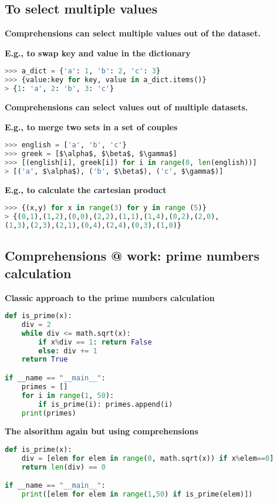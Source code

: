 \subsection{To select multiple values}
\textbf{Comprehensions can select multiple values out of the dataset.}

\textbf{E.g., to swap key and value in the dictionary}
\begin{lstlisting}[language=Python]
>>> a_dict = {'a': 1, 'b': 2, 'c': 3}
>>> {value:key for key, value in a_dict.items()}
> {1: 'a', 2: 'b', 3: 'c'}
\end{lstlisting}
\textbf{Comprehensions can select values out of multiple datasets.}

\textbf{E.g., to merge two sets in a set of couples}
\begin{lstlisting}[language=Python]
>>> english = ['a', 'b', 'c'}
>>> greek = [$\alpha$, $\beta$, $\gamma$]
>>> [(english[i], greek[i]) for i in range(0, len(english))]
> [('a', $\alpha$), ('b', $\beta$), ('c', $\gamma$)]
\end{lstlisting}


\textbf{E.g., to calculate the cartesian product}
\begin{lstlisting}[language=Python]
>>> {(x,y) for x in range(3) for y in range (5)}
> {(0,1),(1,2),(0,0),(2,2),(1,1),(1,4),(0,2),(2,0),
(1,3),(2,3),(2,1),(0,4),(2,4),(0,3),(1,0)}
\end{lstlisting}

\subsection{Comprehensions @ work: prime numbers calculation}
\textbf{Classic approach to the prime numbers calculation}
\begin{lstlisting}[language=Python]
def is_prime(x):
	div = 2
	while div <= math.sqrt(x):
		if x%div == 1: return False		
		else: div += 1
	return True

if __name == "__main__":
	primes = []
	for i in range(1, 50):
		if is_prime(i): primes.append(i)
	print(primes)
\end{lstlisting}
\textbf{The alsorithm again but using comprehensions}
\begin{lstlisting}[language=Python]
def is_prime(x):	
	div = [elem for elem in range(0, math.sqrt(x)) if x%elem==0]
	return len(div) == 0

if __name == "__main__":
	print([elem for elem in range(1,50) if is_prime(elem)])
\end{lstlisting}

